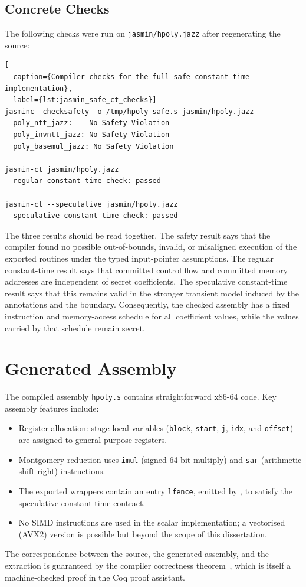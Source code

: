 \subsection{Concrete Checks}

The following checks were run on \texttt{jasmin/hpoly.jazz} after regenerating
the source:

\begin{lstlisting}[
  caption={Compiler checks for the full-safe constant-time implementation},
  label={lst:jasmin_safe_ct_checks}]
jasminc -checksafety -o /tmp/hpoly-safe.s jasmin/hpoly.jazz
  poly_ntt_jazz:    No Safety Violation
  poly_invntt_jazz: No Safety Violation
  poly_basemul_jazz: No Safety Violation

jasmin-ct jasmin/hpoly.jazz
  regular constant-time check: passed

jasmin-ct --speculative jasmin/hpoly.jazz
  speculative constant-time check: passed
\end{lstlisting}

The three results should be read together.  The safety result says that the
compiler found no possible out-of-bounds, invalid, or misaligned execution of
the exported routines under the typed input-pointer assumptions.  The regular
constant-time result says that committed control flow and committed memory
addresses are independent of secret coefficients.  The speculative
constant-time result says that this remains valid in the stronger transient
model induced by the  annotations and the 
boundary.  Consequently, the checked assembly has a fixed instruction and
memory-access schedule for all coefficient values, while the values carried by
that schedule remain secret.

\section{Generated Assembly}

The compiled assembly \texttt{hpoly.s} contains straightforward x86-64 code.
Key assembly features include:
\begin{itemize}
  \item Register allocation: stage-local variables (\texttt{block},
        \texttt{start}, \texttt{j}, \texttt{idx}, and \texttt{offset}) are
        assigned to general-purpose registers.
  \item Montgomery reduction uses \texttt{imul} (signed 64-bit multiply)
        and \texttt{sar} (arithmetic shift right) instructions.
  \item The exported wrappers contain an entry \texttt{lfence}, emitted by
        , to satisfy the speculative constant-time
        contract.
  \item No SIMD instructions are used in the scalar implementation; a
        vectorised (AVX2) version is possible but beyond the scope of this
        dissertation.
\end{itemize}

The correspondence between the \jasmin{} source, the generated assembly, and
the \easycrypt{} extraction is guaranteed by the \jasmin{} compiler
correctness theorem~\cite{Almeida2017}, which is itself a machine-checked
proof in the Coq proof assistant.
